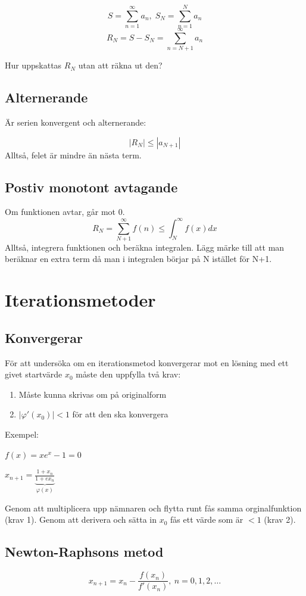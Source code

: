 \documentclass[12pt,a4paper]{article}
\begin{document}
$$ S = \sum_{n=1}^{\infty} a_n, \;
 S_N = \sum_{n=1}^{N} a_n$$
$$ R_N = S - S_N = \sum_{n=N+1}^{\infty} a_n $$

Hur uppskattas $R_N$ utan att räkna ut den?

\subsection{Alternerande}
Är serien konvergent och alternerande:

$$ |R_N| \leq |a_{N+1}|$$
Alltså, felet är mindre än nästa term.

\subsection{Postiv monotont avtagande}
Om funktionen avtar, går mot 0.
$$ R_N = \sum_{N+1}^{\infty} f(n) \leq \int_{N}^{\infty} f(x) dx $$
Alltså, integrera funktionen och beräkna integralen.
Lägg märke till att man beräknar en extra term då man i integralen börjar på N istället för N+1.

\section{Iterationsmetoder}
\subsection{Konvergerar}
För att undersöka om en iterationsmetod konvergerar mot en lösning med ett givet startvärde $x_0$ måste den uppfylla två krav:
\begin{enumerate}
	\item{Måste kunna skrivas om på originalform}
	\item{$ |\varphi' (x_0) | < 1 $ för att den ska konvergera}
\end{enumerate}
Exempel:

$ f(x) = xe^x-1 = 0 $

$ x_{n+1} = \underbrace{\frac{1 + x_n}{1 + e{x_n}}}_\text{$\varphi(x)$}$

Genom att multiplicera upp nämnaren och flytta runt fås samma orginalfunktion (krav 1). Genom att derivera och sätta in $x_0$ fås ett värde som är $< 1$ (krav 2).

\subsection{Newton-Raphsons metod}
$$ x_{n+1} = x_n - \frac{f(x_n)}{f'(x_n)}, \: n = 0,1,2,\ldots $$
\end{document}
